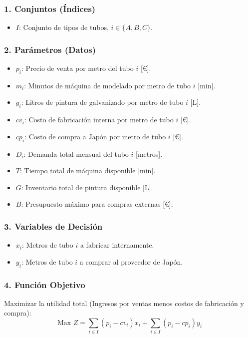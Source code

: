 \documentclass{article}
\begin{document}
	\subsubsection*{1. Conjuntos (Índices)}
	\begin{itemize}
		\item $I$: Conjunto de tipos de tubos, $i \in \{A, B, C\}$.
	\end{itemize}
	
	\subsubsection*{2. Parámetros (Datos)}
	\begin{itemize}
		\item $p_i$: Precio de venta por metro del tubo $i$ [€].
		\item $m_i$: Minutos de máquina de modelado por metro de tubo $i$ [min].
		\item $g_i$: Litros de pintura de galvanizado por metro de tubo $i$ [L].
		\item $cv_i$: Costo de fabricación interna por metro de tubo $i$ [€].
		\item $cp_i$: Costo de compra a Japón por metro de tubo $i$ [€].
		\item $D_i$: Demanda total mensual del tubo $i$ [metros].
		\item $T$: Tiempo total de máquina disponible [min].
		\item $G$: Inventario total de pintura disponible [L].
		\item $B$: Presupuesto máximo para compras externas [€].
	\end{itemize}
	
	\subsubsection*{3. Variables de Decisión}
	\begin{itemize}
		\item $x_i$: Metros de tubo $i$ a fabricar internamente.
		\item $y_i$: Metros de tubo $i$ a comprar al proveedor de Japón.
	\end{itemize}
	
	\subsubsection*{4. Función Objetivo}
	Maximizar la utilidad total (Ingresos por ventas menos costos de fabricación y compra):
	$$ \text{Max } Z = \sum_{i \in I} (p_i - cv_i) x_i + \sum_{i \in I} (p_i - cp_i) y_i $$
	
\end{document}
